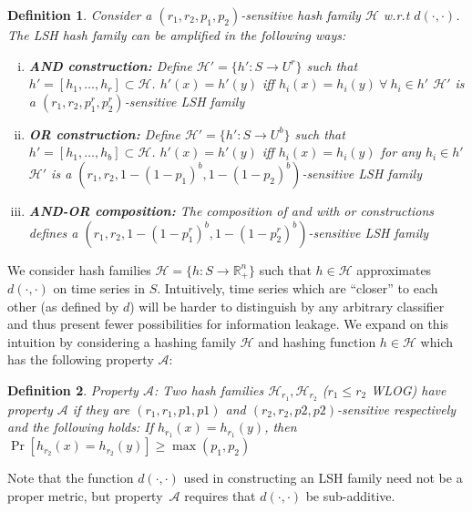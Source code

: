 \documentclass[a4paper]{article}
\newtheorem{definition}{Definition}
\begin{document}
\begin{definition}\label{def:lsh_amplification}
    Consider a $(r_1, r_2, p_1, p_2)$-sensitive hash family $\mathcal{H}$ w.r.t $d(\cdot,\cdot)$. The LSH hash family can be amplified in the following ways:
    \begin{enumerate}[(i)]
        \item \textbf{AND construction:} Define $\mathcal{H}' = \{h' : S \rightarrow U^r\}$ such that $h' = [h_1, \ldots, h_r] \subset \mathcal{H}$.
            $h'(x) = h'(y)$ iff $h_i(x) = h_i(y) ~\forall~h_i \in h'$
            $\mathcal{H'}$ is a $(r_1, r_2, p_1^r, p_2^r)$-sensitive LSH family
        \item \textbf{OR construction:} Define $\mathcal{H}' = \{h' : S \rightarrow U^b\}$ such that $h' = [h_1, \ldots, h_b] \subset \mathcal{H}$.
            $h'(x) = h'(y)$ iff $h_i(x) = h_i(y)$ for any $h_i \in h'$
            $\mathcal{H'}$ is a $(r_1, r_2, 1-{(1-p_1)}^b, 1-{(1-p_2)}^b)$-sensitive LSH family
        \item \textbf{AND-OR composition:} The composition of \textnormal{and} with \textnormal{or} constructions defines a $(r_1, r_2, 1-{(1-p_1^r)}^b, 1-{(1-p_2^r)}^b)$-sensitive LSH family
    \end{enumerate}
\end{definition}

We consider hash families $\mathcal{H} = \{h : S \rightarrow \mathbb{R}_{+}^n\}$ such that $h \in \mathcal{H}$ approximates $d(\cdot,\cdot)$ on time series in $S$.
Intuitively, time series which are ``closer'' to each other (as defined by $d$) will be harder to distinguish by any arbitrary classifier and thus present fewer possibilities for information leakage.
We expand on this intuition by considering a hashing family $\mathcal{H}$ and hashing function $h \in \mathcal{H}$ which has the following property $\mathscr{A}$:

\begin{definition}\label{def:property_alpha}
    Property $\mathscr{A}$:
    Two hash families $\mathcal{H}_{r_1}, \mathcal{H}_{r_2}$ ($r_1 \le r_2$ \textnormal{WLOG}) have property $\mathscr{A}$ if they are $(r_1, r_1, p1, p1)$ and $(r_2, r_2, p2, p2)$-sensitive respectively and the following holds:
    If $h_{r_1}(x) = h_{r_1}(y)$, then $\Pr[h_{r_2}(x) = h_{r_2}(y)] \ge \max(p_1,p_2)$
\end{definition}

Note that the function $d(\cdot,\cdot)$ used in constructing an LSH family need not be a proper metric, but property~$\mathscr{A}$ requires that $d(\cdot,\cdot)$ be sub-additive.
\end{document}

